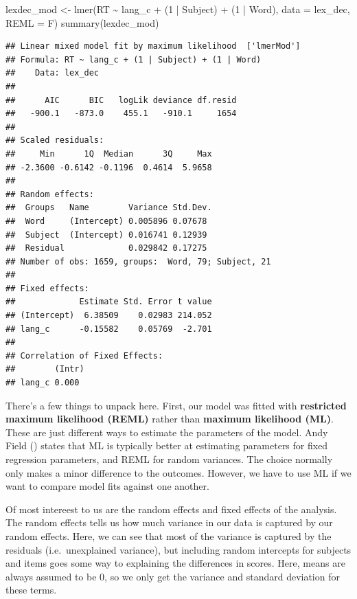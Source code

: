 \documentclass[
]{book}
\newenvironment{Shaded}{\begin{snugshade}}{\end{snugshade}}
\newcommand{\AttributeTok}[1]{\textcolor[rgb]{0.77,0.63,0.00}{#1}}
\newcommand{\DecValTok}[1]{\textcolor[rgb]{0.00,0.00,0.81}{#1}}
\newcommand{\FunctionTok}[1]{\textcolor[rgb]{0.00,0.00,0.00}{#1}}
\newcommand{\NormalTok}[1]{#1}
\newcommand{\OtherTok}[1]{\textcolor[rgb]{0.56,0.35,0.01}{#1}}
\newcommand{\SpecialCharTok}[1]{\textcolor[rgb]{0.00,0.00,0.00}{#1}}
\begin{document}
\begin{Shaded}
\begin{Highlighting}[]
\NormalTok{lexdec\_mod }\OtherTok{\textless{}{-}} \FunctionTok{lmer}\NormalTok{(RT }\SpecialCharTok{\textasciitilde{}}\NormalTok{ lang\_c }\SpecialCharTok{+}\NormalTok{ (}\DecValTok{1} \SpecialCharTok{|}\NormalTok{ Subject) }\SpecialCharTok{+}\NormalTok{ (}\DecValTok{1} \SpecialCharTok{|}\NormalTok{ Word), }\AttributeTok{data =}\NormalTok{ lex\_dec, }\AttributeTok{REML =}\NormalTok{ F)}
\FunctionTok{summary}\NormalTok{(lexdec\_mod)}
\end{Highlighting}
\end{Shaded}

\begin{verbatim}
## Linear mixed model fit by maximum likelihood  ['lmerMod']
## Formula: RT ~ lang_c + (1 | Subject) + (1 | Word)
##    Data: lex_dec
## 
##      AIC      BIC   logLik deviance df.resid 
##   -900.1   -873.0    455.1   -910.1     1654 
## 
## Scaled residuals: 
##     Min      1Q  Median      3Q     Max 
## -2.3600 -0.6142 -0.1196  0.4614  5.9658 
## 
## Random effects:
##  Groups   Name        Variance Std.Dev.
##  Word     (Intercept) 0.005896 0.07678 
##  Subject  (Intercept) 0.016741 0.12939 
##  Residual             0.029842 0.17275 
## Number of obs: 1659, groups:  Word, 79; Subject, 21
## 
## Fixed effects:
##             Estimate Std. Error t value
## (Intercept)  6.38509    0.02983 214.052
## lang_c      -0.15582    0.05769  -2.701
## 
## Correlation of Fixed Effects:
##        (Intr)
## lang_c 0.000
\end{verbatim}

There's a few things to unpack here. First, our model was fitted with \textbf{restricted maximum likelihood (REML)} rather than \textbf{maximum likelihood (ML)}. These are just different ways to estimate the parameters of the model. Andy Field (\citet{field2012discovering}) states that ML is typically better at estimating parameters for fixed regression parameters, and REML for random variances. The choice normally only makes a minor difference to the outcomes. However, we have to use ML if we want to compare model fits against one another.

Of most intereest to us are the random effects and fixed effects of the analysis. The random effects tells us how much variance in our data is captured by our random effects. Here, we can see that most of the variance is captured by the residuals (i.e.~unexplained variance), but including random intercepts for subjects and items goes some way to explaining the differences in scores. Here, means are always assumed to be 0, so we only get the variance and standard deviation for these terms.
\end{document}
